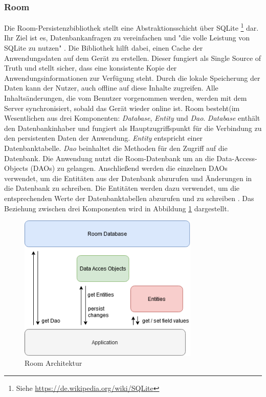 \documentclass[a4paper]{article}
\begin{document}
\subsubsection{Room}
\label{subsubsec:technologies:bibs:room}
Die Room-Persistenzbibliothek stellt eine Abstraktionsschicht über SQLite \footnote{Siehe \url{https://de.wikipedia.org/wiki/SQLite}} dar. Ihr Ziel ist es, Datenbankanfragen zu vereinfachen und "die volle Leistung von SQLite zu nutzen" \cite{android_room_architecture}. Die Bibliothek hilft dabei, einen Cache der Anwendungsdaten auf dem Gerät zu erstellen. Dieser fungiert als Single Source of Truth und stellt sicher, dass eine konsistente Kopie der Anwendungsinformationen zur Verfügung steht. Durch die lokale Speicherung der Daten kann der Nutzer, auch offline auf diese Inhalte zugreifen. Alle Inhaltsänderungen, die vom Benutzer vorgenommen werden, werden mit dem Server synchronisiert, sobald das Gerät wieder online ist.\newline
Room besteht(im Wesentlichen aus drei Komponenten: \textit{Database}, \textit{Entity} und \textit{Dao}. \textit{Database} enthält den Datenbankinhaber und fungiert als Hauptzugriffspunkt für die Verbindung zu den persistenten Daten der Anwendung. \textit{Entity} entspricht einer Datenbanktabelle. \textit{Dao} beinhaltet die Methoden für den Zugriff auf die Datenbank. Die Anwendung nutzt die Room-Datenbank um an die Data-Access-Objects (DAOs) zu gelangen. Anschließend werden die einzelnen DAOs verwendet, um die Entitäten aus der Datenbank abzurufen und Änderungen in die Datenbank zu schreiben. Die Entitäten werden dazu verwendet, um die entsprechenden Werte der Datenbanktabellen abzurufen und zu schreiben \cite{android_room_data_storage}. Das Beziehung zwischen drei Komponenten wird in Abbildung \ref{fig:room} dargestellt.

\begin{figure}[H]
	\centering
	\includegraphics[height=7cm,keepaspectratio]{./images/Room.png}
	\caption{Room Architektur}
	\label{fig:room}
\end{figure}
\end{document}
